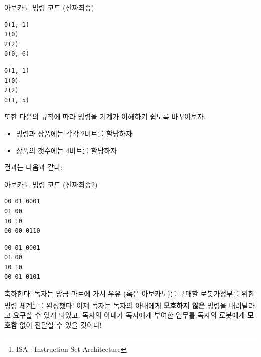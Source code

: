 \documentclass{article}
\begin{document}
\begin{center}

    \centering

    아보카도 명령 코드 (진짜최종)

    \begin{minipage}{0.45\textwidth}
        \begin{lstlisting}[escapeinside=``]
0(1, 1)
1(0)
2(2)
0(0, 6)
        \end{lstlisting}
    \end{minipage}
    \hfill
    \begin{minipage}{0.45\textwidth}
        \begin{lstlisting}[escapeinside=``]
0(1, 1)
1(0)
2(2)
0(1, 5)
        \end{lstlisting}
    \end{minipage}

\end{center}

또한 다음의 규칙에 따라 명령을 기계가 이해하기 쉽도록 바꾸어보자.

\begin{itemize}
    \item 명령과 상품에는 각각 2비트를 할당하자
    \item 상품의 갯수에는 4비트를 할당하자
\end{itemize}

결과는 다음과 같다:

\begin{center}

    \centering
    
    아보카도 명령 코드 (진짜최종2)

    \begin{minipage}{0.45\textwidth}
        \begin{lstlisting}[escapeinside=``]
00 01 0001
01 00
10 10
00 00 0110
        \end{lstlisting}
    \end{minipage}
    \hfill
    \begin{minipage}{0.45\textwidth}
        \begin{lstlisting}[escapeinside=``]
00 01 0001
01 00
10 10
00 01 0101
        \end{lstlisting}
    \end{minipage}

\end{center}

축하한다! 독자는 방금 마트에 가서 우유 (혹은 아보카도)를 구매할
로봇가정부를 위한 명령 체계\footnote{ISA : Instruction Set Architecture}
를 완성했다!
이제 독자는 독자의 아내에게 \textbf{모호하지 않은} 명령을 내려달라고
요구할 수 있게 되었고, 독자의 아내가 독자에게 부여한 업무를 독자의
로봇에게 \textbf{모호함} 없이 전달할 수 있을 것이다!
\end{document}
